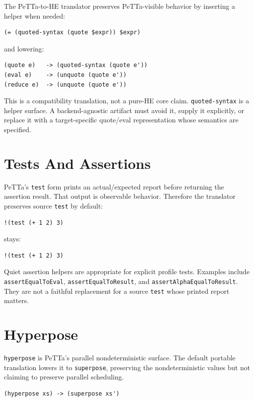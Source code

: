 \documentclass[11pt]{article}
\newcommand{\code}[1]{\texttt{#1}}
\newcommand{\HE}{\textup{HE}}
\newcommand{\PeTTa}{\textup{PeTTa}}
\begin{document}
The \PeTTa{}-to-\HE{} translator preserves \PeTTa{}-visible behavior by
inserting a helper when needed:
\begin{lstlisting}
(= (quoted-syntax (quote $expr)) $expr)
\end{lstlisting}
and lowering:
\begin{lstlisting}
(quote e)   -> (quoted-syntax (quote e'))
(eval e)    -> (unquote (quote e'))
(reduce e)  -> (unquote (quote e'))
\end{lstlisting}

This is a compatibility translation, not a pure-\HE{} core claim.
\code{quoted-syntax} is a helper surface.  A backend-agnostic artifact must
avoid it, supply it explicitly, or replace it with a target-specific
quote/eval representation whose semantics are specified.

\section{Tests And Assertions}

\PeTTa{}'s \code{test} form prints an actual/expected report before returning
the assertion result.  That output is observable behavior.  Therefore the
translator preserves source \code{test} by default:

\begin{lstlisting}
!(test (+ 1 2) 3)
\end{lstlisting}

stays:

\begin{lstlisting}
!(test (+ 1 2) 3)
\end{lstlisting}

Quiet assertion helpers are appropriate for explicit profile tests.  Examples
include \code{assertEqualToEval}, \code{assertEqualToResult}, and
\code{assertAlphaEqualToResult}.  They are not a faithful replacement for a
source \code{test} whose printed report matters.

\section{Hyperpose}

\code{hyperpose} is \PeTTa{}'s parallel nondeterministic surface.  The default
portable translation lowers it to \code{superpose}, preserving the
nondeterministic values but not claiming to preserve parallel scheduling.

\begin{lstlisting}
(hyperpose xs) -> (superpose xs')
\end{lstlisting}
\end{document}
